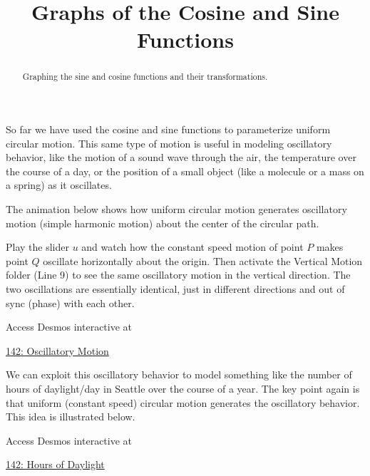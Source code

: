 \documentclass{ximera}
\title{Graphs of the Cosine and Sine Functions}
\begin{document}
\begin{abstract}
Graphing the sine and cosine functions and their transformations.
\end{abstract}
\maketitle


So far we have used the cosine and sine functions to parameterize uniform circular motion. This same type of motion is useful in modeling oscillatory behavior, like the motion of a sound wave through the air, the temperature over the course of a day, or the position of a small object (like a molecule or a mass on a spring) as it oscillates.


\begin{exploration}   \label{Ertr64yhd}

The animation below shows how uniform circular motion generates oscillatory motion (simple harmonic motion) about the center of the circular path.

Play the slider $u$ and watch how the constant speed motion of point $P$ makes point $Q$ oscillate horizontally about the origin. Then activate the Vertical Motion folder (Line 9) to see the same oscillatory motion in the vertical direction. The two oscillations are essentially identical, just in different directions and out of sync (phase) with each other.

Access Desmos interactive at
 
\href{https://www.desmos.com/calculator/ng2ed0t2jh}{142: Oscillatory Motion}

 
\begin{onlineOnly}
    \begin{center}
\end{center}
\end{onlineOnly}

\end{exploration}


We can exploit this oscillatory behavior to model something like the number of hours of daylight/day in Seattle over the course of a year. The key point again is that uniform (constant speed) circular motion generates the oscillatory behavior. This idea is illustrated below.

Access Desmos interactive at
 
\href{https://www.desmos.com/calculator/4qf3zb54vd}{142: Hours of Daylight}

\begin{onlineOnly}
    \begin{center}
\end{center}
\end{onlineOnly}
\end{document}
